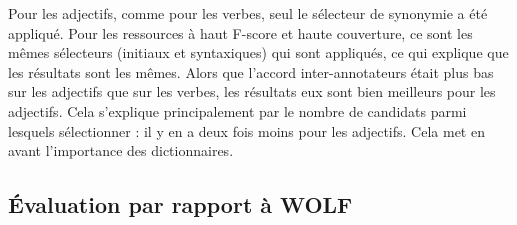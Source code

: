 
Pour les adjectifs, comme pour les verbes, seul le sélecteur de synonymie a été appliqué. Pour les ressources à haut F-score et haute couverture, ce sont les mêmes sélecteurs (initiaux et syntaxiques) qui sont appliqués, ce qui explique que les résultats sont les mêmes. Alors que l'accord inter-annotateurs était plus bas sur les adjectifs que sur les verbes, les résultats eux sont bien meilleurs pour les adjectifs. Cela s'explique principalement par le nombre de candidats parmi lesquels sélectionner : il y en a deux fois moins pour les adjectifs. Cela met en avant l'importance des dictionnaires.

\subsection{Évaluation par rapport à WOLF}
\label{subsec:vswolf}


